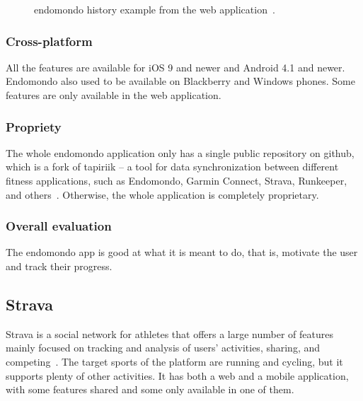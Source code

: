 \begin{figure}[htb!]
    \centering
        \caption{endomondo history example from the web application~\cite{endomondo-history-img}.}
\end{figure}

\subsubsection*{Cross-platform}
All the features are available for iOS 9 and newer and Android 4.1 and newer.
Endomondo also used to be available on Blackberry and Windows phones.
Some features are only available in the web application.
\subsubsection*{Propriety}
The whole endomondo application only has a single public repository on github, which is a fork of tapiriik -- a tool for data synchronization between different fitness applications, such as Endomondo, Garmin Connect, Strava, Runkeeper, and others~\cite{endomondo-tapiriik}.
Otherwise, the whole application is completely proprietary.
\subsubsection*{Overall evaluation}
The endomondo app is good at what it is meant to do, that is, motivate the user and track their progress.
\pagebreak
\pagebreak
\subsection{Strava}
Strava is a social network for athletes that offers a large number of features mainly focused on tracking and analysis of users' activities, sharing, and competing~\cite{strava}.
The target sports of the platform are running and cycling, but it supports plenty of other activities.
It has both a web and a mobile application, with some features shared and some only available in one of them.
